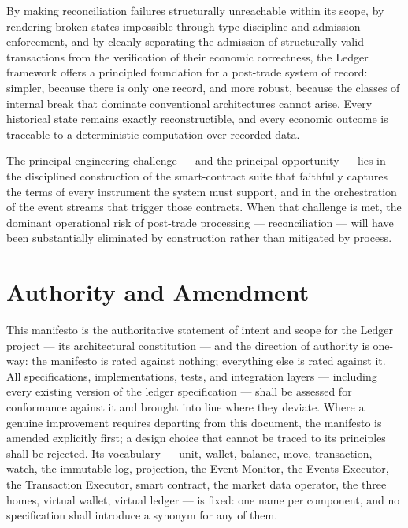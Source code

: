 \documentclass[11pt,a4paper]{article}
\newcommand{\clabel}[1]{\leavevmode\hypertarget{clause-#1}{}%
  \marginpar{\raggedright\scriptsize\ttfamily\textcolor{gray}{#1}}}
\begin{document}
By making reconciliation failures structurally unreachable within its
scope, by rendering broken states impossible through type discipline and
admission enforcement, and by cleanly separating the admission of
structurally valid transactions from the verification of their economic
correctness, the Ledger framework offers a principled foundation for a
post-trade system of record: simpler, because there is only one record,
and more robust, because the classes of internal break that dominate
conventional architectures cannot arise. Every historical state remains
exactly reconstructible, and every economic outcome is traceable to a
deterministic computation over recorded data.

The principal engineering challenge --- and the principal opportunity
--- lies in the disciplined construction of the smart-contract suite
that faithfully captures the terms of every instrument the system must
support, and in the orchestration of the event streams that trigger
those contracts. When that challenge is met, the dominant operational
risk of post-trade processing --- reconciliation --- will have been
substantially eliminated by construction rather than mitigated by
process.

\hypertarget{authority-and-amendment}{%
\section{Authority and Amendment}\label{authority-and-amendment}}

\clabel{C-Auth.1}This manifesto is the authoritative statement of intent and scope for
the Ledger project --- its architectural constitution --- and the
direction of authority is one-way: the manifesto is rated against
nothing; everything else is rated against it. \clabel{C-Auth.2}All specifications,
implementations, tests, and integration layers --- including every
existing version of the ledger specification --- shall be assessed for
conformance against it and brought into line where they deviate. \clabel{C-Auth.3}Where a
genuine improvement requires departing from this document, the manifesto
is amended explicitly first; a design choice that cannot be traced to
its principles shall be rejected. \clabel{C-Auth.4}Its vocabulary --- unit, wallet,
balance, move, transaction, watch, the immutable log, projection, the
Event Monitor, the Events Executor, the Transaction Executor, smart
contract, the market data operator, the three homes, virtual wallet,
virtual ledger --- is fixed: one name per component, and no
specification shall introduce a synonym for any of them.
\end{document}
